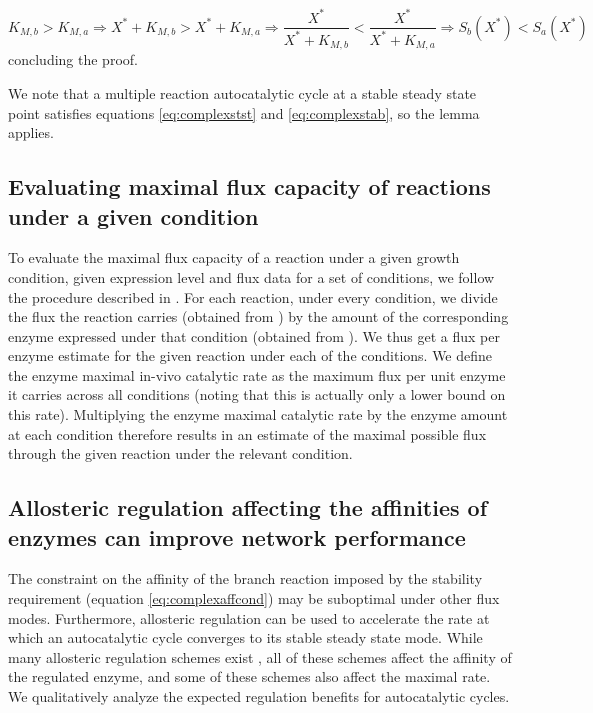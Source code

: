     \begin{equation*}
        K_{M,b}>K_{M,a} \Rightarrow X^*+K_{M,b}>X^*+K_{M,a} \Rightarrow \frac{X^*}{X^*+K_{M,b}}<\frac{X^*}{X^*+K_{M,a} } \Rightarrow S_b(X^*)<S_a(X^*)
    \end{equation*}
    concluding the proof.

    We note that a multiple reaction autocatalytic cycle at a stable steady state point satisfies equations \ref{eq:complexstst} and \ref{eq:complexstab}, so the lemma applies.

    \subsection{Evaluating maximal flux capacity of reactions under a given condition}
    To evaluate the maximal flux capacity of a reaction under a given growth condition, given expression level and flux data for a set of conditions, we follow the procedure described in \cite{Davidi2016-ga}.
    For each reaction, under every condition, we divide the flux the reaction carries (obtained from \cite{Gerosa2015-oq}) by the amount of the corresponding enzyme expressed under that condition (obtained from \cite{Schmidt2015}).
    We thus get a flux per enzyme estimate for the given reaction under each of the conditions.
    We define the enzyme maximal in-vivo catalytic rate as the maximum flux per unit enzyme it carries across all conditions (noting that this is actually only a lower bound on this rate).
    Multiplying the enzyme maximal catalytic rate by the enzyme amount at each condition therefore results in an estimate of the maximal possible flux through the given reaction under the relevant condition.

    \subsection{Allosteric regulation affecting the affinities of enzymes can improve network performance}
    The constraint on the affinity of the branch reaction imposed by the stability requirement (equation \ref{eq:complexaffcond}) may be suboptimal under other flux modes.
    Furthermore, allosteric regulation can be used to accelerate the rate at which an autocatalytic cycle converges to its stable steady state mode.
    While many allosteric regulation schemes exist \cite{Leskovac2003-li}, all of these schemes affect the affinity of the regulated enzyme, and some of these schemes also affect the maximal rate.
    We qualitatively analyze the expected regulation benefits for autocatalytic cycles.


